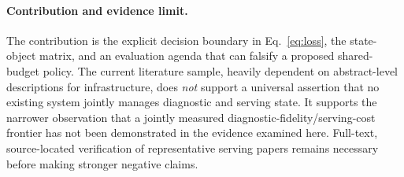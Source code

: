 \paragraph*{Contribution and evidence limit.}
The contribution is the explicit decision boundary in Eq.~\ref{eq:loss}, the state-object matrix, and an evaluation agenda that can falsify a proposed shared-budget policy. The current literature sample, heavily dependent on abstract-level descriptions for infrastructure, does \emph{not} support a universal assertion that no existing system jointly manages diagnostic and serving state. It supports the narrower observation that a jointly measured diagnostic-fidelity/serving-cost frontier has not been demonstrated in the evidence examined here. Full-text, source-located verification of representative serving papers remains necessary before making stronger negative claims.
